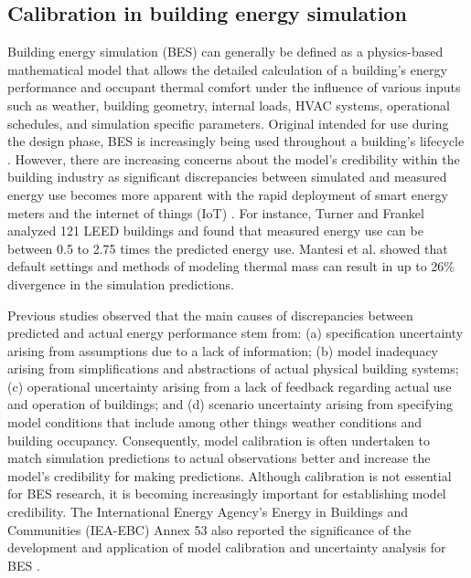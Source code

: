 \documentclass[review]{elsarticle}
\begin{document}
\subsection{Calibration in building energy simulation}
Building energy simulation (BES) can generally be defined as a physics-based mathematical model that allows the detailed calculation of a building's energy performance and occupant thermal comfort under the influence of various inputs such as weather, building geometry, internal loads, HVAC systems, operational schedules, and simulation specific parameters. Original intended for use during the design phase, BES is increasingly being used throughout a building's lifecycle \cite{hensen2019building}. However, there are increasing concerns about the model's credibility within the building industry as significant discrepancies between simulated and measured energy use becomes more apparent with the rapid deployment of smart energy meters and the internet of things (IoT) \cite{de2014gap}. For instance, Turner and Frankel \cite{turner2008energy} analyzed 121 LEED buildings and found that measured energy use can be between 0.5 to 2.75 times the predicted energy use. Mantesi et al. \cite{mantesi2018modelling} showed that default settings and methods of modeling thermal mass can result in up to 26\% divergence in the simulation predictions. 

Previous studies \cite{menezes2012predicted, de2002analysis} observed that the main causes of discrepancies between predicted and actual energy performance stem from: (a) specification uncertainty arising from assumptions due to a lack of information; (b) model inadequacy arising from simplifications and abstractions of actual physical building systems; (c) operational uncertainty arising from a lack of feedback regarding actual use and operation of buildings; and (d) scenario uncertainty arising from specifying model conditions that include among other things weather conditions and building occupancy. Consequently, model calibration is often undertaken to match simulation predictions to actual observations better and increase the model's credibility for making predictions. Although calibration is not essential for BES research, it is becoming increasingly important for establishing model credibility. The International Energy Agency's Energy in Buildings and Communities (IEA-EBC) Annex 53 also reported the significance of the development and application of model calibration and uncertainty analysis for BES \cite{yoshino2017iea}. 
\end{document}
